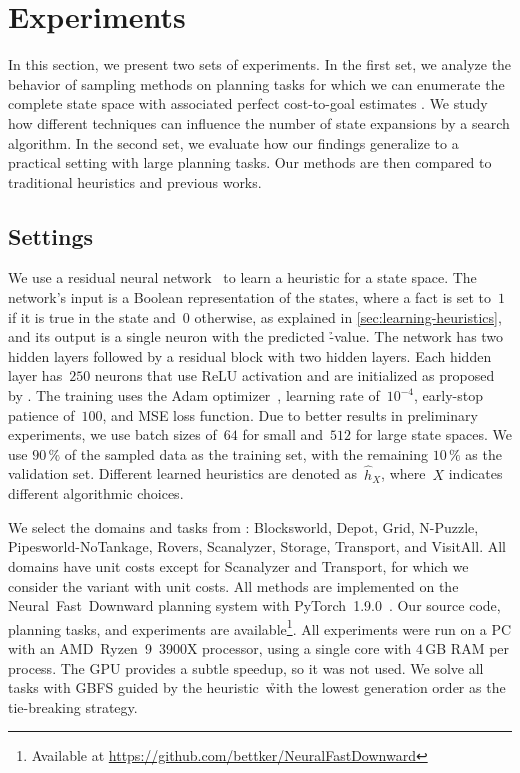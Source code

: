 \chapter{Experiments}
\label{sec:experiments}

In this section, we present two sets of experiments. In the first set, we analyze the behavior of sampling methods on planning tasks for which we can enumerate the complete state space with associated perfect cost-to-goal estimates \hstar. We study how different techniques can influence the number of state expansions by a search algorithm. In the second set, we evaluate how our findings generalize to a practical setting with large planning tasks. Our methods are then compared to traditional heuristics and previous works.

\section{Settings}
\label{sec:settings}

We use a residual neural network~\cite{he2016deep} to learn a heuristic for a state space. The network's input is a Boolean representation of the states, where a fact is set to~$1$ if it is true in the state and~$0$ otherwise, as explained in \cref{sec:learning-heuristics}, and its output is a single neuron with the predicted \h-value. The network has two hidden layers followed by a residual block with two hidden layers. Each hidden layer has~$250$ neurons that use ReLU activation and are initialized as proposed by \citet{he2015delving}. The training uses the Adam optimizer~\cite{kingma2015adam}, learning rate of~$10^{-4}$, early-stop patience of~$100$, and MSE loss function. Due to better results in preliminary experiments, we use batch sizes of~$64$ for small and~$512$ for large state spaces. We use $90\,\%$ of the sampled data as the training set, with the remaining $10\,\%$ as the validation set. Different learned heuristics are denoted as~$\hat h_X$, where~$X$ indicates different algorithmic choices.

We select the domains and tasks from \citet{ferber2022neural}: Blocksworld, \mbox{Depot}, Grid, N-Puzzle, Pipesworld-NoTankage, Rovers, Scanalyzer, Storage, Transport, and \mbox{VisitAll}. All domains have unit costs except for Scanalyzer and Transport, for which we consider the variant with unit costs. All methods are implemented on the Neural~Fast~Downward planning system with PyTorch~1.9.0~\cite{ferber2020neural,paszke2019pytorch}. Our source code, planning tasks, and experiments are available\footnote{Available at \url{https://github.com/bettker/NeuralFastDownward}}. All experiments were run on a PC with an AMD~Ryzen~9~3900X processor, using a single core with $4$\,GB RAM per process. The GPU provides a subtle speedup, so it was not used. We solve all tasks with GBFS guided by the heuristic~\h with the lowest generation order as the tie-breaking strategy.

